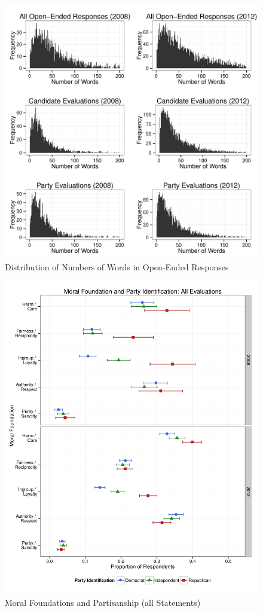 \documentclass[12pt]{article}
\begin{document}
\begin{figure}[ht]\centering
\includegraphics[scale=.8]{../calc/fig/a0_num.pdf}
\caption{Distribution of Numbers of Words in Open-Ended Responses}\label{fig:a0_num}
\end{figure}

\begin{figure}[ht]\centering
\includegraphics[scale=.4]{../calc/fig/a1_mft_pid.pdf}
\caption{Moral Foundations and Partisanship (all Statements)}\label{fig:a1_mft_pid}
\end{figure}
\end{document}
